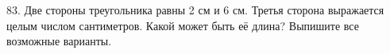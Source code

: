 83. Две стороны треугольника равны 2 см и 6 см. Третья сторона выражается целым числом сантиметров. Какой может быть её длина? Выпишите все возможные варианты.\\
